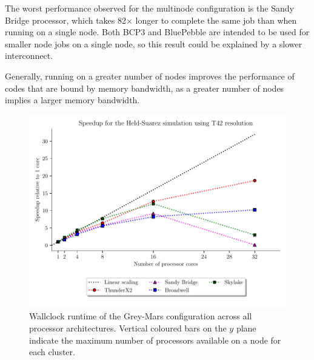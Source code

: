\documentclass[a4paper,11pt]{report}
\begin{document}
\par
The worst performance observed for the multinode configuration is the Sandy Bridge processor, which takes 82$\times$ longer to complete the same job than when running on a single node. Both BCP3 and BluePebble are intended to be used for smaller node jobs on a single node, so this result could be explained by a slower interconnect. 
\par
Generally, running on a greater number of nodes improves the performance of codes that are bound by memory bandwidth, as a greater number of nodes implies a larger memory bandwidth. 

\begin{figure}[htbp]
\begin{center}
\includegraphics[width=0.9\linewidth]{img/speedup-T42-Held_suarez.pdf}
\caption{Wallclock runtime of the Grey-Mars configuration across all processor architectures. Vertical coloured bars on the $y$ plane indicate the maximum number of processors available on a node for each cluster.}
\label{default}
\end{center}
\end{figure}

\newpage
\end{document}

